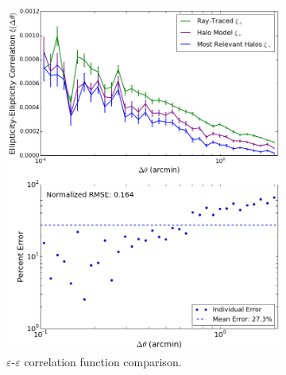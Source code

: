 \documentclass[%
 reprint,
 amsmath,amssymb,
 aps,nofootinbib
]{revtex4-1}
\begin{document}
\begin{figure}
    \centering
    \begin{subfigure}{0.475\textwidth}
        \includegraphics[width=\textwidth]{figs-swe/thesis/rel_gg_compare.png}
        \caption{$\varepsilon$-$\varepsilon$ correlation function comparison.}
        \label{fig:rel_gg_compare}
    \end{subfigure}
    ~~
    \begin{subfigure}{0.475\textwidth}

\end{subfigure}
\end{figure}
\end{document}
